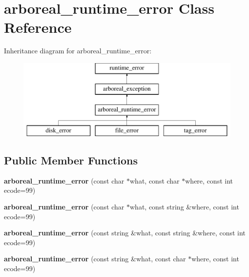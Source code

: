 \hypertarget{classarboreal__runtime__error}{}\section{arboreal\+\_\+runtime\+\_\+error Class Reference}
\label{classarboreal__runtime__error}
Inheritance diagram for arboreal\+\_\+runtime\+\_\+error\+:\begin{figure}[H]
\begin{center}
\leavevmode
\includegraphics[height=4.000000cm]{classarboreal__runtime__error}
\end{center}
\end{figure}
\subsection*{Public Member Functions}
\begin{DoxyCompactItemize}
\item 
{\bfseries arboreal\+\_\+runtime\+\_\+error} (const char $\ast$what, const char $\ast$where, const int ecode=99)\hypertarget{classarboreal__runtime__error_aa6970966b569a105ead4fc6a5648cb5e}{}\label{classarboreal__runtime__error_aa6970966b569a105ead4fc6a5648cb5e}

\item 
{\bfseries arboreal\+\_\+runtime\+\_\+error} (const char $\ast$what, const string \&where, const int ecode=99)\hypertarget{classarboreal__runtime__error_af20cdd8f990b40293bbbf11f3fe1005b}{}\label{classarboreal__runtime__error_af20cdd8f990b40293bbbf11f3fe1005b}

\item 
{\bfseries arboreal\+\_\+runtime\+\_\+error} (const string \&what, const string \&where, const int ecode=99)\hypertarget{classarboreal__runtime__error_a3797d6f9ba8c5590539b280042d023a5}{}\label{classarboreal__runtime__error_a3797d6f9ba8c5590539b280042d023a5}

\item 
{\bfseries arboreal\+\_\+runtime\+\_\+error} (const string \&what, const char $\ast$where, const int ecode=99)\hypertarget{classarboreal__runtime__error_a897b94adcbe8bdbcd8c7299d95c4e020}{}\label{classarboreal__runtime__error_a897b94adcbe8bdbcd8c7299d95c4e020}

\end{DoxyCompactItemize}
